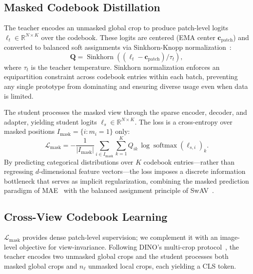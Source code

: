 \documentclass[runningheads]{llncs}
\DeclareMathOperator{\softmax}{softmax}
\DeclareMathOperator{\sinkhorn}{Sinkhorn}
\begin{document}
\subsection{Masked Codebook Distillation}
\label{sec:kodiak_loss}

The teacher encodes an unmasked global crop to produce patch-level logits $\boldsymbol{\ell}_t \in \mathbb{R}^{N \times K}$ over the codebook.
These logits are centered (EMA center $\mathbf{c}_{\text{patch}}$) and converted to balanced soft assignments via Sinkhorn-Knopp normalization~\cite{caron2020unsupervised}:
\begin{equation}
    \mathbf{Q} = \sinkhorn\!\left((\boldsymbol{\ell}_t - \mathbf{c}_{\text{patch}}) / \tau_t\right),
\end{equation}
where $\tau_t$ is the teacher temperature.
Sinkhorn normalization enforces an equipartition constraint across codebook entries within each batch, preventing any single prototype from dominating and ensuring diverse usage even when data is limited.

The student processes the masked view through the sparse encoder, decoder, and adapter, yielding student logits $\boldsymbol{\ell}_s \in \mathbb{R}^{N \times K}$.
The loss is a cross-entropy over masked positions $I_{\text{mask}} = \{i : m_i = 1\}$ only:
\begin{equation}
    \mathcal{L}_{\text{mask}} = -\frac{1}{|I_{\text{mask}}|}
    \sum_{i \in I_{\text{mask}}} \sum_{k=1}^{K} Q_{ik}\, \log \softmax(\boldsymbol{\ell}_{s,i})_k.
\end{equation}
By predicting categorical distributions over $K$ codebook entries---rather than regressing $d$-dimensional feature vectors---the loss imposes a discrete information bottleneck that serves as implicit regularization, combining the masked prediction paradigm of MAE~\cite{he2022masked} with the balanced assignment principle of SwAV~\cite{caron2020unsupervised}.

\subsection{Cross-View Codebook Learning}
\label{sec:cls_loss}

$\mathcal{L}_{\text{mask}}$ provides dense patch-level supervision; we complement it with an image-level objective for view-invariance.
Following DINO's multi-crop protocol~\cite{caron2021emerging}, the teacher encodes two unmasked global crops and the student processes both masked global crops and $n_\ell$ unmasked local crops, each yielding a CLS token.
\end{document}
